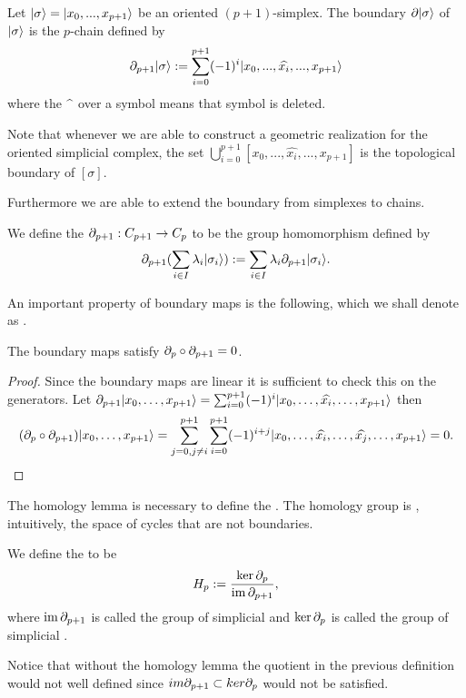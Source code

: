 \documentclass[../1.tex]{subfiles}
\begin{document}
    \begin{defn}
        Let $| \sigma \rangle = | x_0,...,x_{p+1} \rangle$ be an oriented $(p+1)$-simplex. The boundary $\partial| \sigma \rangle$ of $| \sigma \rangle$ is the $p$-chain
        defined by \[ \partial_{p+1}| \sigma \rangle := \sum_{i = 0}^{p+1}(-1)^i| x_0,...,\widehat{x_i},...,x_{p+1} \rangle\]
        where the  $\widehat{\color{white} a}$  over a symbol means that symbol is deleted.
    \end{defn}

    \begin{rem}
        Note that whenever we are able to construct a geometric realization for the oriented simplicial complex, the set $\bigcup_{i = 0}^{p+1}[x_0,...,\widehat{x_i},...,x_{p+1}]$
        is the topological boundary of $[\sigma]$.
    \end{rem}

    Furthermore we are able to extend the boundary from simplexes to chains.
    
    \begin{defn}
        We define the  $\partial_{p+1} : C_{p+1} \to C_p$ to be the group homomorphism defined by
        \[ \partial_{p+1}(\sum_{i \in I}\lambda_i| \sigma_i \rangle) := \sum_{i \in I}\lambda_i\partial_{p+1}| \sigma_i \rangle .\]
    \end{defn}

    An important property of boundary maps is the following, which we shall denote as .

    \begin{lem}
        The boundary maps satisfy $\partial_p \circ \partial_{p+1} = 0$.
    \end{lem}
    \begin{proof}
        Since the boundary maps are linear it is sufficient to check this on the generators.
        Let $\partial_{p+1}| x_0,\dots,x_{p+1} \rangle = \sum_{i=0}^{p+1} (-1)^i| x_0,\dots,\widehat{x_i},\dots,x_{p+1} \rangle$ then 
        \[(\partial_p \circ \partial_{p+1})| x_0,\dots,x_{p+1} \rangle = \sum_{j=0, j \neq i}^{p+1} \sum_{i=0}^{p+1} (-1)^{i+j}| x_0,\dots,\widehat{x_i},\dots,\widehat{x_j},\dots,x_{p+1} \rangle = 0. \qedhere \]     
    \end{proof}

    The homology lemma is necessary to define the .
    The homology group is , intuitively,  the space of cycles that are not boundaries.

    \begin{defn}
        We define the  to be 
        \[H_p := \frac{\ker\partial_p}{\mathrm{im}\,\partial_{p+1}},\] 
        where $\mathrm{im}\,\partial_{p+1}$ is called the group of simplicial  and
        $\ker\partial_p$ is called the group of simplicial .
    \end{defn}

    Notice that without the
    homology lemma the quotient in the previous definition would not well defined since $im\partial_{p+1} \subset ker\partial_p$ would not be satisfied.
\end{document}
